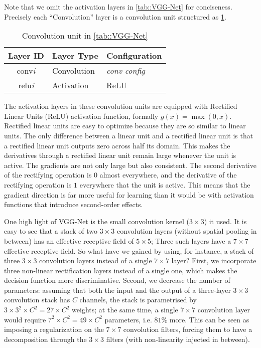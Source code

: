 Note that we omit the activation layers in \ref{tab::VGG-Net} for conciseness. 
Precisely each ``Convolution'' layer is a convolution unit structured as \ref{tab::VGG-CU}.
\begin{table}[htb]
    \centering
    \caption{Convolution unit in \ref{tab::VGG-Net}}
    \label{tab::VGG-CU}
    \begin{tabular}{cll}
        \toprule
        Layer ID & Layer Type & Configuration \\
        \midrule
        conv\textit{i} & Convolution & \textit{conv config} \\
        relu\textit{i} & Activation  & ReLU \\
        \bottomrule
    \end{tabular}
\end{table}
The activation layers in these convolution units are equipped with Rectified Linear Units (ReLU)
activation function, formally $g(x) = \max (0, x)$. 
Rectified linear units are easy to optimize because they are so similar to linear units. 
The only difference between a linear unit and a rectified linear unit is that a rectified linear unit outputs zero across half its domain. 
This makes the derivatives through a rectified linear unit remain large whenever the unit is active.
The gradients are not only large but also consistent. The second derivative of the rectifying operation is $0$ almost everywhere, 
and the derivative of the rectifying operation is $1$ everywhere that the unit is active. 
This means that the gradient direction is far more useful for learning than it would be with activation functions
that introduce second-order effects.

One high light of VGG-Net is the small convolution kernel ($3\times3$) it used.
It is easy to see that a stack of two
$3\times3$ convolution layers (without spatial pooling in between) has an effective receptive field of $5\times5$;
Three such layers have a $7\times7$ effective receptive field.
So what have we gained by using, for instance, a
stack of three $3\times3$ convolution layers instead of a single $7\times7$ layer? 
First, we incorporate three non-linear
rectification layers instead of a single one, which makes the decision function more discriminative.
Second, we decrease the number of parameters: assuming that both the input and the output of a
three-layer $3\times3$ convolution stack has $C$ channels, the stack is parametrised by $3\times 3^2 \times C^2=27 \times C^2$
weights; at the same time, a single $7\times7$ convolution layer would require $7^2 \times C^2 = 49 \times C^2$ parameters, i.e.
$81\%$ more. This can be seen as imposing a regularization on the $7\times7$ convolution filters, forcing them to
have a decomposition through the $3\times3$ filters (with non-linearity injected in between).
    
